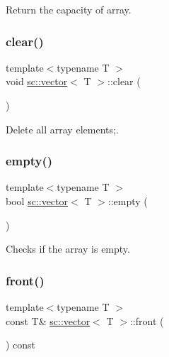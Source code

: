 Return the capacity of array. 

\mbox{\label{classsc_1_1vector_a17c6d622cf64278d03feac9c38fa3684}} 
\subsubsection{\texorpdfstring{clear()}{clear()}}
{\footnotesize\ttfamily template$<$typename T $>$ \\
void \hyperlink{classsc_1_1vector}{sc\+::vector}$<$ T $>$\+::clear (\begin{DoxyParamCaption}{ }\end{DoxyParamCaption})\hspace{0.3cm}{\ttfamily [inline]}}



Delete all array elements;. 

\mbox{\label{classsc_1_1vector_a74d59d93240b308c7b4409af489bc3c5}} 
\subsubsection{\texorpdfstring{empty()}{empty()}}
{\footnotesize\ttfamily template$<$typename T $>$ \\
bool \hyperlink{classsc_1_1vector}{sc\+::vector}$<$ T $>$\+::empty (\begin{DoxyParamCaption}{ }\end{DoxyParamCaption})\hspace{0.3cm}{\ttfamily [inline]}}



Checks if the array is empty. 

\mbox{\label{classsc_1_1vector_a85da6164a082030bd04de354d657da0d}} 
\subsubsection{\texorpdfstring{front()}{front()}}
{\footnotesize\ttfamily template$<$typename T $>$ \\
const T\& \hyperlink{classsc_1_1vector}{sc\+::vector}$<$ T $>$\+::front (\begin{DoxyParamCaption}{ }\end{DoxyParamCaption}) const}

